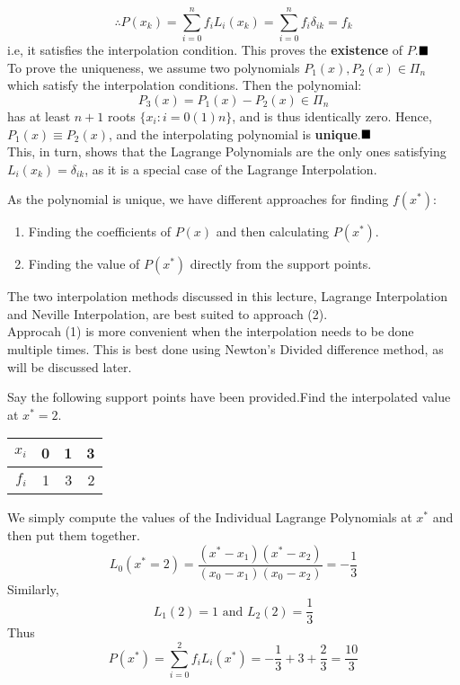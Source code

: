 $$\therefore P(x_k) = \sum_{i=0}^{n} f_i L_i(x_k) =
        \sum_{i=0}^{n} f_i \delta_{ik} = f_k$$
i.e, it satisfies the interpolation condition.
This proves the \textbf{existence} of $P$.$\hfill \blacksquare$\\[.2 cm]
To prove the uniqueness, we assume two polynomials $P_1(x),P_2(x) \in \Pi_n$ which satisfy the interpolation conditions. Then the polynomial:
$$P_3(x) = P_1(x)-P_2(x) \in \Pi_n$$ has at least $n+1$ roots $\{x_i: i = 0(1)n\}$, and is thus identically zero. Hence, $P_1(x) \equiv P_2(x)$, and the interpolating polynomial is \textbf{unique}.$ \hfill\blacksquare $\\[0.2 cm]
This, in turn, shows that the Lagrange Polynomials are the only ones satisfying $L_i(x_k) = \delta_{ik}$, as it is a special case of the Lagrange Interpolation.
\begin{rmark}
    As the polynomial is unique, we have different approaches for finding $f(x^*)$:
    \begin{enumerate}
        \item Finding the coefficients of $P(x)$ and then calculating $P(x^*)$.
        \item Finding the value of $P(x^*)$ directly from the support points.
    \end{enumerate}
    The two interpolation methods discussed in this lecture, Lagrange Interpolation and Neville Interpolation, are best suited to approach (2).\\
    Approcah (1) is more convenient when the interpolation needs to be done multiple times. This is best done using Newton's Divided difference method, as will be discussed later.
\end{rmark}
\begin{example}
    Say the following support points have been provided.Find the interpolated value at $x^* = 2$.\\[0.2 cm]
    \begin{center}
        \begin{tabular}{|r||r|r|r|}
            \hline
            $x_i$ & 0 & 1 & 3 \\
            \hline
            $f_i$ & 1 & 3 & 2 \\
            \hline
        \end{tabular}
    \end{center}
\end{example}
\begin{soln}
    We simply compute the values of the Individual Lagrange Polynomials at $x^*$ and then put them together.
    $$L_0(x^* = 2) = \frac{(x^* - x_1)(x^* - x_2)}{(x_0 - x_1)(x_0 - x_2)} = -\frac{1}{3}$$
    Similarly,
    $$L_1(2) = 1 \text{  and  } L_2(2) = \frac{1}{3}$$
    Thus $$P(x^*) = \sum_{i = 0}^2 f_i L_i(x^*) = -\frac{1}{3}+ 3 + \frac{2}{3} = \frac{10}{3}$$
\end{soln}



